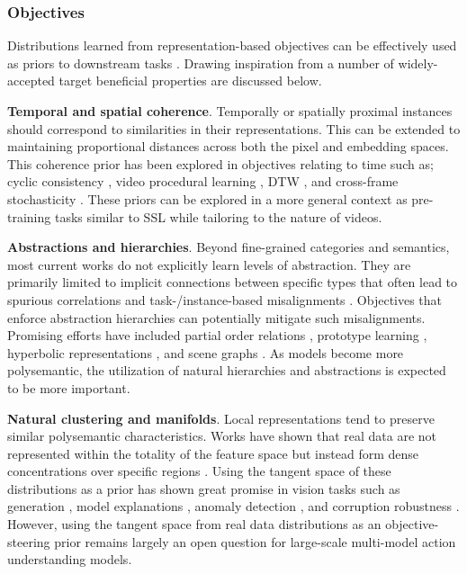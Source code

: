 \subsubsection{Objectives}

Distributions learned from representation-based objectives can be effectively used as priors to downstream tasks \citep{bengio2013representation,janocha2017loss,larochelle2009exploring}. Drawing inspiration from \citep{bengio2013representation} a number of widely-accepted target beneficial properties are discussed below.

\noindent
\textbf{Temporal and spatial coherence}. Temporally or spatially proximal instances should correspond to similarities in their representations. This can be extended to maintaining proportional distances across both the pixel and embedding spaces. This coherence prior has been explored in objectives relating to time such as; cyclic consistency \citep{dwibedi2018temporal,donahue2024learning,haresh2021learning}, video procedural learning \citep{chen2022frame,sermanet2018time}, DTW \citep{dvornik2021drop,hadji2021representation}, and cross-frame stochasticity \citep{zhang2023modeling}. These priors can be explored in a more general context as pre-training tasks similar to SSL while tailoring to the nature of videos. 

\noindent
\textbf{Abstractions and hierarchies}. Beyond fine-grained categories and semantics, most current works do not explicitly learn levels of abstraction. They are primarily limited to implicit connections between specific types \citep{li2024deal} that often lead to spurious correlations \citep{chen2020counterfactual,kim2023exposing,tian2024argue} and task-/instance-based misalignments \citep{zhang2024rethinking}. Objectives that enforce abstraction hierarchies can potentially mitigate such misalignments. Promising efforts have included partial order relations \citep{alper2024emergent},  prototype learning \citep{ramesh2022hierarchical}, hyperbolic representations \citep{mettes2024hyperbolic}, and scene graphs \citep{li2024scene}. As models become more polysemantic, the utilization of natural hierarchies and abstractions is expected to be more important.

\noindent
\textbf{Natural clustering and manifolds}. Local representations tend to preserve similar polysemantic characteristics. Works have shown that real data are not represented within the totality of the feature space but instead form dense concentrations over specific regions \citep{genovese2012minimax,jiang2018trust,liang2022mind}. Using the tangent space of these distributions as a prior has shown great promise in vision tasks such as generation \citep{he2023manifold}, model explanations \citep{bordt2023manifold}, anomaly detection \citep{shin2023anomaly}, and corruption robustness \citep{chen2022vita}. However, using the tangent space from real data distributions as an objective-steering prior remains largely an open question for large-scale multi-model action understanding models. 



